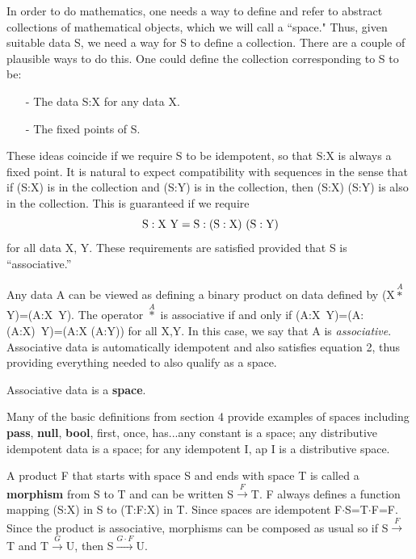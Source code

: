 \documentclass[11pt]{article}
\begin{document}
      In order to do mathematics, one needs a way to define and refer to abstract collections of mathematical objects, which we will call a ``space."  
 Thus, given suitable data S, we need a way for S to define a collection.  There are a couple of plausible ways 
 to do this.  One could define the collection corresponding to S to be:
\begin{itemize} 
\item[-] The data S:X for any data X.
\item[-] The fixed points of S.  
\end{itemize}
These ideas coincide if we require S to be idempotent, so that S:X is always a fixed point.  It is natural to expect compatibility with sequences in the sense that if (S:X) is 
in the collection and (S:Y) is in the collection, then (S:X) (S:Y) is also in the collection.  This is guaranteed if we require 
\begin{equation}
{\rm S : X\ Y = S : (S:X)\ (S:Y)}
\end{equation}
for all data X, Y.  
These requirements are satisfied provided that S is ``associative.''  

      Any data A can be viewed as defining a binary product on data defined by (X${\overset A\ast}$Y)=(A:X\ Y).  The operator ${\overset A\ast}$ is associative if and only if 
 (A:X\ Y)=(A:(A:X)\ Y)=(A:X (A:Y)) for all X,Y.  In this case, we say that A is {\it associative}.  Associative data is automatically idempotent and also satisfies equation 2, thus providing 
 everything needed to also qualify as a space.  

\begin{definition} Associative data is a {\bf space}.  
\end{definition}

\noindent Many of the basic definitions from section 4 provide examples of spaces including {\bf pass}, {\bf null}, {\bf bool}, first, once, has...any constant is a space; 
any distributive idempotent data is a space; 
for any idempotent I, ap I is a distributive space. 

A product F that starts with space S and ends with space T is called a {\bf morphism} from S to T and can be written S${\overset F\longrightarrow}$T.
F always defines a function mapping (S:X) in S to (T:F:X) in T.  Since spaces are idempotent F$\cdot$S=T$\cdot$F=F.  Since the product is associative, 
morphisms can be composed as usual so if S${\overset F\longrightarrow}$T and 
T${\overset G\longrightarrow}$U, then S${\overset {G\cdot F}\longrightarrow}$U.  
\end{document}
